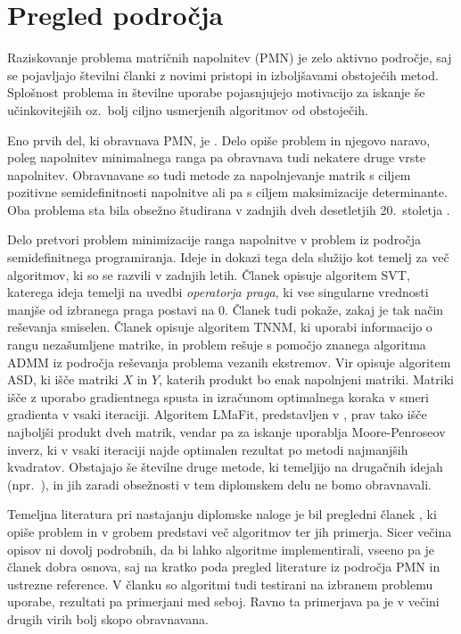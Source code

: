 \chapter{Pregled področja} \label{1407-1010}

Raziskovanje problema matričnih napolnitev (PMN) je zelo aktivno področje, saj se pojavljajo številni članki z novimi pristopi in izboljšavami obstoječih metod.  Splošnost problema in številne uporabe pojasnjujejo motivacijo za iskanje še učinkovitejših oz.\ bolj ciljno usmerjenih algoritmov od obstoječih.

Eno prvih del, ki obravnava PMN, je \cite{MCPAS}. Delo opiše problem in njegovo naravo, poleg napolnitev minimalnega ranga pa obravnava tudi nekatere druge vrste napolnitev. Obravnavane so tudi metode za napolnjevanje matrik s ciljem pozitivne semidefinitnosti napolnitve ali pa s ciljem maksimizacije determinante. Oba problema sta bila obsežno študirana v zadnjih dveh desetletjih 20.\ stoletja \cite{Barret, Dancis,Woerdeman}.

Delo \cite{NNM-PHD} pretvori problem minimizacije ranga napolnitve v problem iz področja semidefinitnega programiranja. Ideje in dokazi tega dela služijo kot temelj za več algoritmov, ki so se razvili v zadnjih letih.
Članek \cite{CCS} opisuje algoritem SVT, katerega ideja temelji na uvedbi \textit{operatorja praga}, ki vse singularne vrednosti manjše od izbranega praga postavi na 0. Članek tudi pokaže, zakaj je tak način reševanja smiselen.
Članek \cite{TNNM-HZYLH12} opisuje algoritem TNNM, ki uporabi informacijo o rangu nezašumljene matrike, in problem rešuje s pomočjo znanega algoritma ADMM \cite{admmForNNM} iz področja reševanja problema vezanih ekstremov. 
Vir \cite{AST-TK15} opisuje algoritem ASD, ki išče matriki $X$ in $Y$, katerih produkt bo enak napolnjeni matriki. Matriki išče z uporabo gradientnega spusta in izračunom optimalnega koraka v smeri gradienta v vsaki iteraciji.  
Algoritem LMaFit, predstavljen v \cite{LMaFit-WY12}, prav tako išče najboljši produkt dveh matrik, vendar pa za iskanje uporablja Moore-Penroseov inverz, ki v vsaki iteraciji najde optimalen rezultat po metodi najmanjših kvadratov.
Obstajajo še številne druge metode, ki temeljijo na drugačnih idejah (npr.\ \cite{admira,Riemannian,SETalgo}), in jih zaradi obsežnosti v tem diplomskem delu ne bomo obravnavali. 


Temeljna literatura pri nastajanju diplomske naloge je bil pregledni članek \cite{Survey-NKS19}, ki opiše problem in v grobem predstavi več algoritmov ter jih primerja. Sicer večina opisov ni dovolj podrobnih, da bi lahko algoritme implementirali, vseeno pa je  članek dobra osnova, saj na kratko poda pregled literature iz področja PMN in ustrezne reference. V članku so algoritmi tudi testirani na izbranem problemu uporabe,
rezultati pa primerjani med seboj. Ravno ta primerjava pa je v večini drugih virih bolj skopo obravnavana.

